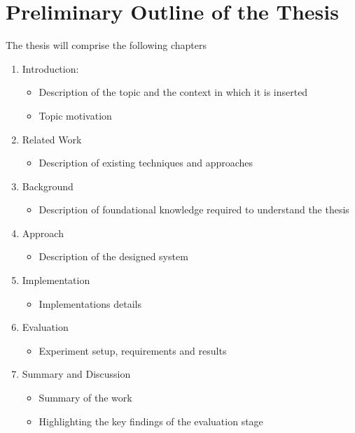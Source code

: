 \chapter{Preliminary Outline of the Thesis}
\label{ch:outline}

The thesis will comprise the following chapters
\begin{enumerate}
	\item Introduction:
		\begin{itemize}
			\item Description of the topic and the context in which it is inserted
			\item Topic motivation
		\end{itemize}
	
	\item Related Work
	\begin{itemize}
		\item Description of existing techniques and approaches
	\end{itemize}
	
	\item Background
	\begin{itemize}
		\item Description of foundational knowledge required to understand the thesis
	\end{itemize}
	
	\item Approach
	\begin{itemize}
		\item Description of the designed system
	\end{itemize}
	
	\item Implementation
	\begin{itemize}
		\item Implementations details
	\end{itemize}
	
	\item Evaluation
	\begin{itemize}
		\item Experiment setup, requirements and results
	\end{itemize}
	
	\item Summary and Discussion
	\begin{itemize}
		\item Summary of the work
		\item Highlighting the key findings of the evaluation stage
	\end{itemize}
\end{enumerate}

